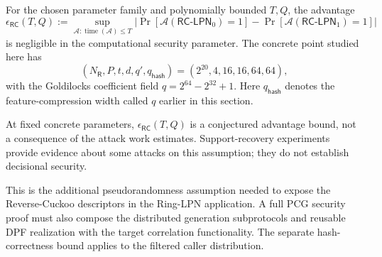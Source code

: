 \begin{assumption}
\label{ass:rc-decisional-lpn}
For the chosen parameter family and polynomially bounded $T,Q$, the advantage
\[
 \epsilon_{\mathsf{RC}}(T,Q):=
 \sup_{\mathcal A:\operatorname{time}(\mathcal A)\leq T}
 \left|\Pr[\mathcal A(\mathsf{RC\text{-}LPN}_0)=1]
       -\Pr[\mathcal A(\mathsf{RC\text{-}LPN}_1)=1]\right|
\]
is negligible in the computational security parameter.
The concrete point studied here has
\[
 (N_{\mathsf R},P,t,d,q',q_{\mathsf{hash}})
 =(2^{20},4,16,16,64,64),
\]
with the Goldilocks coefficient field $q=2^{64}-2^{32}+1$.
Here $q_{\mathsf{hash}}$ denotes
the feature-compression width called $q$ earlier in this section.
\end{assumption}

At fixed concrete parameters, $\epsilon_{\mathsf{RC}}(T,Q)$ is a conjectured
advantage bound, not a consequence of the attack work estimates.
Support-recovery experiments provide evidence about some attacks on this
assumption; they do not establish decisional security.

This is the additional pseudorandomness assumption needed to expose the
Reverse-Cuckoo descriptors in the Ring-LPN application.
A full PCG security proof must also compose the distributed generation
subprotocols and reusable DPF realization with the target correlation
functionality. The separate hash-correctness bound applies to the filtered
caller distribution.
